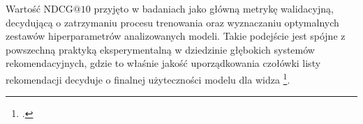 Wartość $\text{NDCG@10}$ przyjęto w badaniach jako główną metrykę walidacyjną, decydującą o zatrzymaniu procesu trenowania oraz wyznaczaniu optymalnych zestawów hiperparametrów analizowanych modeli. Takie podejście jest spójne z powszechną praktyką eksperymentalną w dziedzinie głębokich systemów rekomendacyjnych, gdzie to właśnie jakość uporządkowania czołówki listy rekomendacji decyduje o finalnej użyteczności modelu dla widza \footcite{anelliTopNRecommendationAlgorithms2022}.
